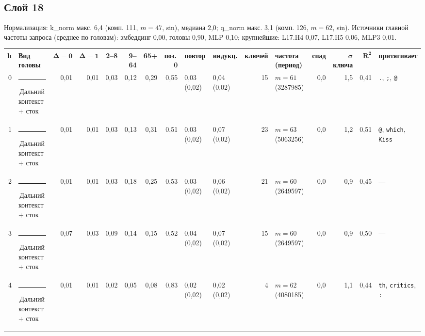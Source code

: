 \documentclass[10pt]{article}
\begin{document}
\noindent\begin{minipage}{\linewidth}
\subsection*{Слой 18}
{\small\color{ink2} Нормализация: k\_norm макс. 6,4 (комп. 111, $m{=}47$, sin), медиана 2,0; q\_norm макс. 3,1 (комп. 126, $m{=}62$, sin). Источники главной частоты запроса (среднее по головам): эмбеддинг 0,00, головы 0,90, MLP 0,10; крупнейшие: L17.H4 0,07, L17.H5 0,06, MLP3 0,01.}
\begin{center}{\footnotesize\begin{tabular}{|r|l|r|r|r|r|r|r|l|l|r|l|r|r|r|l|}
\hline
\rowcolor{head}\textbf{h} & \textbf{Вид головы} & $\boldsymbol{\Delta{=}0}$ & $\boldsymbol{\Delta{=}1}$ & \textbf{2–8} & \textbf{9–64} & \textbf{65+} & \textbf{поз.\,0} & \textbf{повтор} & \textbf{индукц.} & \textbf{ключей} & \textbf{частота (период)} & \textbf{спад} & $\boldsymbol{\sigma}$ \textbf{ключа} & $\boldsymbol{R^2}$ & \textbf{притягивает} \\ \hline
0 & \textcolor[HTML]{C3C2B7}{\rule{0.62em}{0.62em}}\,Дальний контекст + сток & 0,01 & 0,01 & 0,03 & 0,12 & 0,29 & 0,55 & 0,03 (0,02) & 0,04 (0,02) & 15 & $m{=}61$ (3287985) & 0,0 & 1,5 & 0,41 & \texttt{\textvisiblespace{}.}, \texttt{\textvisiblespace{};}, \texttt{\textvisiblespace{}@} \\ \hline
1 & \textcolor[HTML]{C3C2B7}{\rule{0.62em}{0.62em}}\,Дальний контекст + сток & 0,01 & 0,01 & 0,03 & 0,13 & 0,31 & 0,51 & 0,03 (0,02) & 0,07 (0,02) & 23 & $m{=}63$ (5063256) & 0,0 & 1,2 & 0,51 & \texttt{\textvisiblespace{}@}, \texttt{\textvisiblespace{}which}, \texttt{\textvisiblespace{}Kiss} \\ \hline
2 & \textcolor[HTML]{C3C2B7}{\rule{0.62em}{0.62em}}\,Дальний контекст + сток & 0,01 & 0,01 & 0,03 & 0,18 & 0,25 & 0,53 & 0,03 (0,02) & 0,06 (0,02) & 21 & $m{=}60$ (2649597) & 0,0 & 0,9 & 0,45 & — \\ \hline
3 & \textcolor[HTML]{C3C2B7}{\rule{0.62em}{0.62em}}\,Дальний контекст + сток & 0,07 & 0,03 & 0,09 & 0,14 & 0,15 & 0,52 & 0,04 (0,02) & 0,07 (0,02) & 15 & $m{=}60$ (2649597) & 0,0 & 0,9 & 0,50 & — \\ \hline
4 & \textcolor[HTML]{C3C2B7}{\rule{0.62em}{0.62em}}\,Дальний контекст + сток & 0,01 & 0,01 & 0,02 & 0,05 & 0,08 & 0,83 & 0,02 (0,02) & 0,02 (0,02) & 4 & $m{=}62$ (4080185) & 0,0 & 1,1 & 0,44 & \texttt{th}, \texttt{\textvisiblespace{}critics}, \texttt{\textvisiblespace{}:} \\ \hline

\end{tabular}}
\end{center}
\end{minipage}
\end{document}
